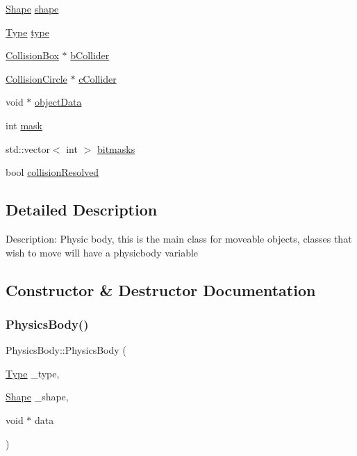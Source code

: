 \begin{DoxyCompactItemize}
\item 
\mbox{\hyperlink{_physics_body_8h_a55b506070847a13554f8b879c1bfb37c}{Shape}} \mbox{\hyperlink{class_physics_body_aa54a7af3e49e0aa6a4f0c9669baeb24b}{shape}}
\item 
\mbox{\hyperlink{_physics_body_8h_a1d1cfd8ffb84e947f82999c682b666a7}{Type}} \mbox{\hyperlink{class_physics_body_aec0c643403d115034db77f9556ebb774}{type}}
\item 
\mbox{\hyperlink{class_collision_box}{Collision\+Box}} $\ast$ \mbox{\hyperlink{class_physics_body_a2e644dd99d939f7af5de4ab63c4c81ee}{b\+Collider}}
\item 
\mbox{\hyperlink{class_collision_circle}{Collision\+Circle}} $\ast$ \mbox{\hyperlink{class_physics_body_a8bab8d599fc696a85012b4ce0f52d6c1}{c\+Collider}}
\item 
void $\ast$ \mbox{\hyperlink{class_physics_body_a0bad7a41147e44610ace7dcb18aea582}{object\+Data}}
\item 
int \mbox{\hyperlink{class_physics_body_a381dfd66c0454ac81cf17ad002f64a93}{mask}}
\item 
std\+::vector$<$ int $>$ \mbox{\hyperlink{class_physics_body_a2cc8c6425619a9c056f2f962c5ddb040}{bitmasks}}
\item 
bool \mbox{\hyperlink{class_physics_body_a6d39988426d9664ee5903245c43b8778}{collision\+Resolved}}
\end{DoxyCompactItemize}


\subsection{Detailed Description}
Description\+: Physic body, this is the main class for moveable objects, classes that wish to move will have a physicbody variable 

\subsection{Constructor \& Destructor Documentation}
\mbox{\label{class_physics_body_a129ea9472bad343856460345704d9c5e}} 
\subsubsection{\texorpdfstring{PhysicsBody()}{PhysicsBody()}}
{\footnotesize\ttfamily Physics\+Body\+::\+Physics\+Body (\begin{DoxyParamCaption}\item[{\mbox{\hyperlink{_physics_body_8h_a1d1cfd8ffb84e947f82999c682b666a7}{Type}}}]{\+\_\+type,  }\item[{\mbox{\hyperlink{_physics_body_8h_a55b506070847a13554f8b879c1bfb37c}{Shape}}}]{\+\_\+shape,  }\item[{void $\ast$}]{data }\end{DoxyParamCaption})}

